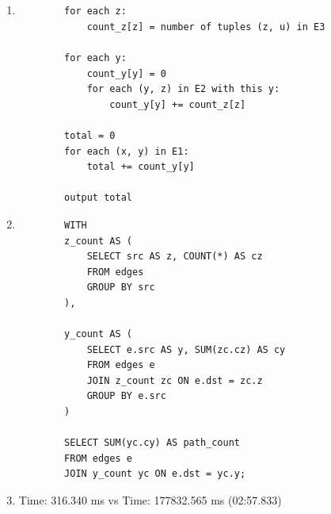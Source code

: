\documentclass{article}
\begin{document}
\section{}

\begin{enumerate}
    \item 
    \begin{verbatim}
        for each z:
            count_z[z] = number of tuples (z, u) in E3

        for each y:
            count_y[y] = 0
            for each (y, z) in E2 with this y:
                count_y[y] += count_z[z]

        total = 0
        for each (x, y) in E1:
            total += count_y[y]

        output total
    \end{verbatim}
    \item 
    \begin{verbatim}
        WITH
        z_count AS (
            SELECT src AS z, COUNT(*) AS cz
            FROM edges
            GROUP BY src
        ),

        y_count AS (
            SELECT e.src AS y, SUM(zc.cz) AS cy
            FROM edges e
            JOIN z_count zc ON e.dst = zc.z
            GROUP BY e.src
        )

        SELECT SUM(yc.cy) AS path_count
        FROM edges e
        JOIN y_count yc ON e.dst = yc.y;

    \end{verbatim}
    \item Time: 316.340 ms vs Time: 177832.565 ms (02:57.833)

\end{enumerate}
\end{document}
